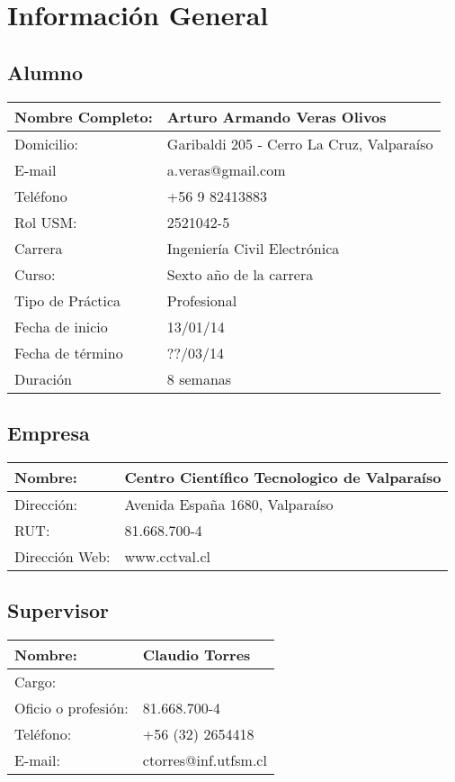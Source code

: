 \documentclass[11pt,oneside]{article}
\begin{document}

\newpage
\section{Información General}

\subsection{Alumno}
\begin{tabular}{|l|l|}
\hline 
Nombre Completo: & Arturo Armando Veras Olivos \\ 
\hline 
Domicilio: & Garibaldi 205 - Cerro La Cruz, Valpara\'iso \\ 
\hline 
E-mail & a.veras@gmail.com \\ 
\hline 
Tel\'efono & +56 9 82413883 \\ 
\hline 
Rol USM: & 2521042-5 \\ 
\hline 
Carrera & Ingenier\'ia Civil Electr\'onica \\ 
\hline 
Curso: & Sexto año de la carrera \\ 
\hline 
Tipo de Pr\'actica & Profesional \\ 
\hline 
Fecha de inicio & 13/01/14 \\ 
\hline 
Fecha de t\'ermino & ??/03/14 \\ 
\hline 
Duraci\'on & 8 semanas \\ 
\hline 
\end{tabular} 
\subsection{Empresa}

\begin{tabular}{|l|l|}
\hline 
Nombre: & Centro Cient\'ifico Tecnologico de Valpara\'iso \\ 
\hline 
Direcci\'on: & Avenida España 1680, Valpara\'iso \\ 
\hline 
RUT:  & 81.668.700-4 \\ 
\hline 
Direcci\'on Web: & www.cctval.cl \\ 
\hline 
\end{tabular} 

\subsection{Supervisor}
\begin{tabular}{|l|l|}
\hline 
Nombre: & Claudio Torres \\ 
\hline 
Cargo: &   \\ 
\hline 
Oficio o profesi\'on:  & 81.668.700-4 \\ 
\hline 
Tel\'efono: & +56 (32) 2654418 \\ 
\hline 
E-mail: & ctorres@inf.utfsm.cl \\ 
\hline
\end{tabular} 
\newpage
\end{document}
